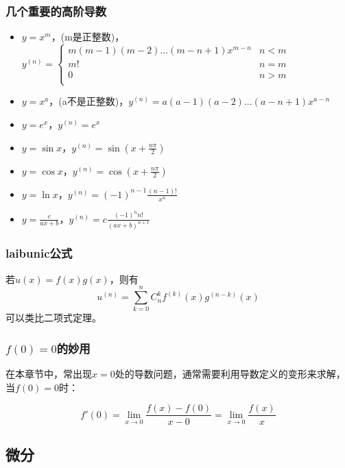 \documentclass[12pt , a4paper , oneside]{ctexart}
\begin{document}
            \subsubsection{几个重要的高阶导数}
            \begin{itemize}
                \item $y = x^m$，(m是正整数)，$y^{(n)} = \begin{cases}
                    m(m-1)(m-2)...(m-n+1)x^{m-n} & n < m\\
                    m! & n = m\\
                    0 & n > m\\
                \end{cases}$
                \item $y = x^a$，(a不是正整数)，$y^{(n)} = a(a-1)(a-2)...(a-n+1)x^{a-n}$
                \item $y = e^x$，$y^{(n)} = e^x$
                \item $y = \sin x$，$y^{(n)} = \sin(x + \frac{n\pi}{2})$
                \item $y = \cos x$，$y^{(n)} = \cos(x + \frac{n\pi}{2})$
                \item $y = \ln x$，$y^{(n)} = (-1)^{n-1} \frac{(n-1)!}{x^n}$
                \item $y = \frac{c}{ax+b}$，$y^{(n)} = c \frac{(-1)^n n!} {(ax+b)^{n+1}}$
            \end{itemize}
            \subsubsection{laibunic公式}
            若$u(x) = f(x)g(x)$，则有
            $$u^{(n)} = \sum\limits_{k=0}^{n} C_n^k f^{(k)}(x)g^{(n-k)}(x)$$
            可以类比二项式定理。

            \subsubsection{$f(0)=0$的妙用}
            在本章节中，常出现$x=0$处的导数问题，通常需要利用导数定义的变形来求解，当$f(0)=0$时：
            
            $$f'(0) = \lim\limits_{x \to 0} \frac{f(x) - f(0)}{x - 0} = \lim\limits_{x \to 0} \frac{f(x)}{x}$$

            \quad

        \subsection{微分}
\end{document}
